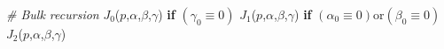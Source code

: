 \begin{algorithm}
\begin{algorithmic}

    \State
    \State \textit{\# Bulk recursion }
    \State \Return $J _ 0$($p$,$\alpha$,$\beta$,$\gamma$) \textbf{if} $(\gamma_0 \equiv 0)$
    \State \Return $J _ 1$($p$,$\alpha$,$\beta$,$\gamma$) \textbf{if} $(\alpha_0 \equiv 0)$or$(\beta_0\equiv 0)$
    \State \Return $J _ 2$($p$,$\alpha$,$\beta$,$\gamma$)


\end{algorithmic}
\end{algorithm}
